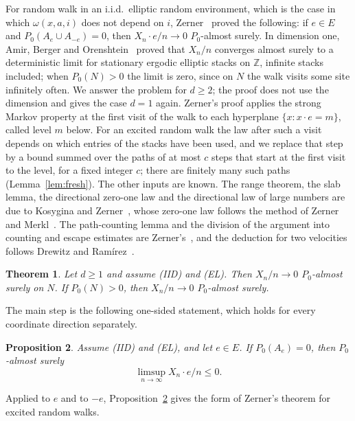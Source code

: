 \documentclass[11pt]{amsart}
\newtheorem{theorem}{Theorem}[section]
\newtheorem{proposition}[theorem]{Proposition}
\theoremstyle{remark}
\newcommand{\Z}{\mathbb{Z}}
\begin{document}
\medskip
For random walk in an i.i.d.\ elliptic random environment, which is the case in which $\omega(x,a,i)$ does not depend
on $i$, Zerner~\cite[Theorem 1]{Zer02} proved the following: if $e\in E$ and $P_0(A_e\cup A_{-e})=0$, then
$X_n\cdot e/n\to0$ $P_0$-almost surely. In dimension one, Amir, Berger and Orenshtein~\cite[Theorem 1.3]{ABO16} proved
that $X_n/n$ converges almost surely to a deterministic limit for stationary ergodic elliptic stacks on $\Z$, infinite
stacks included; when $P_0(N)>0$ the limit is zero, since on $N$ the walk visits some site infinitely often. We answer
the problem for $d\ge2$; the proof does not use the dimension and gives the case $d=1$ again. Zerner's proof applies
the strong Markov property at the first visit of the walk to each hyperplane $\{x:x\cdot e=m\}$, called level $m$
below. For an excited random walk the law after such a visit depends on which entries of the stacks have been used,
and we replace that step by a bound summed over the paths of at most $c$ steps that start at the first visit to the
level, for a fixed integer $c$; there are finitely many such paths (Lemma~\ref{lem:fresh}).
The other inputs are known. The range theorem, the slab lemma, the directional zero-one law and the directional law
of large numbers are due to Kosygina and Zerner~\cite[Theorem~2.5, Lemma~3.18 and Theorems~3.16 and~4.6]{KZ13}, whose
zero-one law follows the method of Zerner and Merkl~\cite[Proposition~3]{ZM01}. The path-counting lemma and the
division of the argument into counting and escape estimates are Zerner's~\cite[Lemma~3 and the proof of
Theorem~1]{Zer02}, and the deduction for two velocities follows Drewitz and Ram\'irez~\cite[Theorem~1.5]{DR10}.

\begin{theorem}\label{thm:main}
Let $d\ge1$ and assume (IID) and (EL). Then $X_n/n\to0$ $P_0$-almost surely on $N$. If $P_0(N)>0$, then $X_n/n\to0$
$P_0$-almost surely.
\end{theorem}

The main step is the following one-sided statement, which holds for every coordinate direction separately.

\begin{proposition}\label{prop:onesided}
Assume (IID) and (EL), and let $e\in E$. If $P_0(A_e)=0$, then $P_0$-almost surely
\[
\limsup_{n\to\infty}X_n\cdot e/n\le0 .
\]
\end{proposition}

Applied to $e$ and to $-e$, Proposition~\ref{prop:onesided} gives the form of Zerner's theorem for excited random walks.
\end{document}
